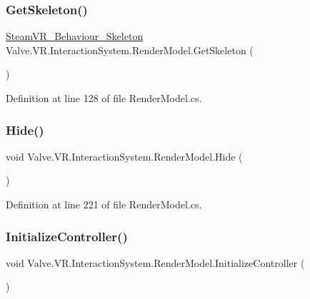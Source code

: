 \subsubsection{\texorpdfstring{GetSkeleton()}{GetSkeleton()}}
{\footnotesize\ttfamily \mbox{\hyperlink{class_valve_1_1_v_r_1_1_steam_v_r___behaviour___skeleton}{Steam\+V\+R\+\_\+\+Behaviour\+\_\+\+Skeleton}} Valve.\+V\+R.\+Interaction\+System.\+Render\+Model.\+Get\+Skeleton (\begin{DoxyParamCaption}{ }\end{DoxyParamCaption})}



Definition at line 128 of file Render\+Model.\+cs.

\mbox{\label{class_valve_1_1_v_r_1_1_interaction_system_1_1_render_model_a090968700e04c79f78aab583551e3d83}} 
\subsubsection{\texorpdfstring{Hide()}{Hide()}}
{\footnotesize\ttfamily void Valve.\+V\+R.\+Interaction\+System.\+Render\+Model.\+Hide (\begin{DoxyParamCaption}{ }\end{DoxyParamCaption})}



Definition at line 221 of file Render\+Model.\+cs.

\mbox{\label{class_valve_1_1_v_r_1_1_interaction_system_1_1_render_model_a06f0ce57f5e18097692d47ca59d211f4}} 
\subsubsection{\texorpdfstring{InitializeController()}{InitializeController()}}
{\footnotesize\ttfamily void Valve.\+V\+R.\+Interaction\+System.\+Render\+Model.\+Initialize\+Controller (\begin{DoxyParamCaption}{ }\end{DoxyParamCaption})\hspace{0.3cm}{\ttfamily [protected]}}



